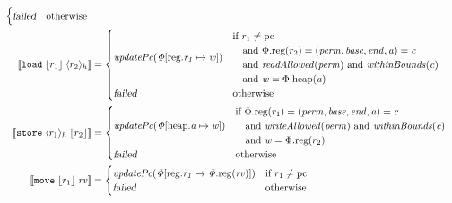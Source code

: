 \documentclass{article}
\newcommand{\update}[2]{[#1 \mapsto #2]}
\newcommand{\sem}[1]{\left\llbracket #1 \right\rrbracket}
\newcommand{\var}[1]{\mathit{#1}}
\newcommand{\rv}{\var{rv}}
\newcommand{\pcreg}{\mathrm{pc}}
\newcommand{\addr}{\var{a}}
\newcommand{\start}{\var{base}}
\newcommand{\addrend}{\var{end}}
\newcommand{\perm}{\var{perm}}
\newcommand{\plainproj}[1]{\mathrm{#1}}
\newcommand{\memheap}[1][\Phi]{#1.\plainproj{heap}}
\newcommand{\memreg}[1][\Phi]{#1.\plainproj{reg}}
\newcommand{\updateHeap}[3][\Phi]{#1\update{\plainproj{heap}.#2}{#3}}
\newcommand{\updateReg}[3][\Phi]{#1\update{\plainproj{reg}.#2}{#3}}
\newcommand{\failed}{\textsl{failed}}
\newcommand{\plainfun}[1]{\mathit{#1}}
\newcommand{\readAllowed}[1]{\plainfun{readAllowed}(#1)}
\newcommand{\writeAllowed}[1]{\plainfun{writeAllowed}(#1)}
\newcommand{\withinBounds}[1]{\plainfun{withinBounds}(#1)}
\newcommand{\stdUpdatePc}[1]{\plainfun{updatePc(#1)}}
\newcommand{\refreg}[1]{\lfloor #1 \rfloor}
\newcommand{\refheap}[1]{\langle #1 \rangle_h}
\newcommand{\instr}[1]{\mathtt{#1}}
\newcommand{\twoinstr}[3]{\instr{#1} \; #2 \; #3}
\newcommand{\move}[2]{\twoinstr{move}{#1}{#2}}
\newcommand{\store}[2]{\twoinstr{store}{#1}{#2}}
\newcommand{\load}[2]{\twoinstr{load}{#1}{#2}}
\begin{document}
\begin{align*}
\begin{cases}
                                               \failed & \text{otherwise }
                                             \end{cases} \\
 \sem{\load{\refreg{r_1}}{\refheap{r_2}}}  & = 
                                             \begin{cases}
                                               \stdUpdatePc{\updateReg{r_1}{\var{w}}} &
                                               \arraycolsep=0pt
                                               \begin{array}{l}
                                                 \text{if } r_1 \neq \pcreg \\
                                                 \quad\text{and }\memreg(r_2) = (\perm,\start,\addrend,\addr) = \var{c} \\
                                                 \quad\text{and }\readAllowed{\perm} \text{ and } \withinBounds{\var{c}} \\
                                                 \quad\text{and }\var{w} = \memheap(\addr)
                                               \end{array}\\
                                               \failed & \text{otherwise }
                                             \end{cases}\\
 \sem{\store{\refheap{r_1}}{\refreg{r_2}}} & = 
                                             \begin{cases}
                                               \stdUpdatePc{\updateHeap{\addr}{\var{w}}} &
                                               \arraycolsep=0pt
                                               \begin{array}{l}
                                                 \text{if }\memreg(r_1) = (\perm,\start,\addrend,\addr) = \var{c} \\
                                                 \quad\text{and }\writeAllowed{\perm} \text{ and } \withinBounds{\var{c}} \\
                                                 \quad\text{and }\var{w} = \memreg(r_2)
                                               \end{array}\\
                                               \failed & \text{otherwise }
                                             \end{cases}\\
 \sem{\move{\refreg{r_1}}{\rv}}            & = \begin{cases}
                                                 \stdUpdatePc{\updateReg{r_1}{\memreg(\rv)}} & \text{if $r_1 \neq \pcreg$} \\ %
                                                 \failed   & \text{otherwise }
                                 \end{cases}
\end{align*}
\end{document}
